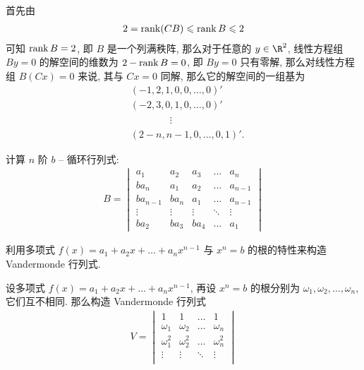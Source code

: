 \begin{exercise}[series=exer]
\begin{answer}
      首先由
      \begin{align*}
          2 = \rank(CB) \leqslant \rank B \leqslant 2
      \end{align*}
      可知 $ \rank B = 2 $, 即 $ B $ 是一个列满秩阵, 那么对于任意的 $ y \in \R^{2} $, 线性方程组 $ By = 0 $ 的解空间的维数为 $ 2 - \rank B = 0 $, 即 $ By = 0 $ 只有零解, 那么对线性方程组 $ B(Cx) = 0 $ 来说, 其与 $ Cx = 0 $ 同解, 那么它的解空间的一组基为
      \begin{align*}
          & (-1, 2, 1, 0, 0, \dots, 0)'\\
          & (-2, 3, 0, 1, 0, \dots, 0)'\\
          & \phantom{(-2, 3, 0, } \vdots \\
          & (2 - n, n - 1, 0, \dots, 0, 1)'.
      \end{align*}
  \end{answer}
  \item  计算 $ n $ 阶 $ b $ -- 循环行列式:
  \begin{align*}
      B = \begin{vmatrix}
          a_{1}   & a_{2} & a_{3} & \ldots    & a_{n} \\
          ba_{n}  & a_{1} & a_{2} & \ldots    & a_{n-1} \\
          ba_{n-1}    & ba_{n}    & a_{1} & \ldots & a_{n-1} \\
          \vdots  & \vdots & \vdots & \ddots & \vdots \\
          ba_{2} & ba_{3} & ba_{4} & \ldots & a_{1}
      \end{vmatrix}
  \end{align*}
  \begin{hint}
      利用多项式 $ f(x) = a_{1} + a_{2}x + \dots + a_{n}x^{n-1} $ 与 $ x^{n} = b $ 的根的特性来构造 Vandermonde 行列式.
  \end{hint}
  \begin{answer}
      设多项式 $ f(x) = a_{1} + a_{2}x + \dots + a_{n}x^{n-1} $, 再设 $ x^{n} = b $ 的根分别为 $ \omega_{1}, \omega_{2}, \dots, \omega_{n} $, 它们互不相同. 那么构造 Vandermonde 行列式
      \begin{align*}
          V = \begin{vmatrix}
              1 & 1 & \dots & 1\\
              \omega_{1} & \omega_{2} & \dots & \omega_{n}\\
              \omega_{1}^{2} & \omega_{2}^{2} & \dots & \omega_{n}^{2}\\
              \vdots & \vdots & \ddots & \vdots\\

\end{vmatrix}
\end{align*}
\end{answer}
\end{exercise}
